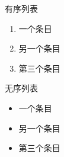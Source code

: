 \documentclass{ctexart}
\begin{document}
有序列表
\begin{enumerate}
    \item 一个条目
    \item 另一个条目
    \item 第三个条目
\end{enumerate}

无序列表
\begin{itemize}
    \item 一个条目
    \item 另一个条目
    \item 第三个条目
\end{itemize}
\end{document}
